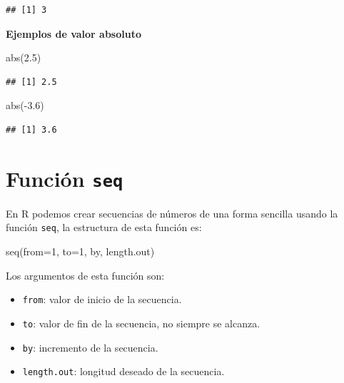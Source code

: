 \documentclass[
]{book}
\makeatletter
\newenvironment{Shaded}{\begin{snugshade}}{\end{snugshade}}
\newcommand{\AttributeTok}[1]{\textcolor[rgb]{0.77,0.63,0.00}{#1}}
\newcommand{\DecValTok}[1]{\textcolor[rgb]{0.00,0.00,0.81}{#1}}
\newcommand{\FloatTok}[1]{\textcolor[rgb]{0.00,0.00,0.81}{#1}}
\newcommand{\FunctionTok}[1]{\textcolor[rgb]{0.00,0.00,0.00}{#1}}
\newcommand{\NormalTok}[1]{#1}
\newcommand{\SpecialCharTok}[1]{\textcolor[rgb]{0.00,0.00,0.00}{#1}}
\providecommand{\tightlist}{%
  \setlength{\itemsep}{0pt}\setlength{\parskip}{0pt}}
\newenvironment{kframe}{%
\medskip{}
\setlength{\fboxsep}{.8em}
 \def\at@end@of@kframe{}%
 \ifinner\ifhmode%
  \def\at@end@of@kframe{\end{minipage}}%
  \begin{minipage}{\columnwidth}%
 \fi\fi%
 \def\FrameCommand##1{\hskip\@totalleftmargin \hskip-\fboxsep
 \colorbox{shadecolor}{##1}\hskip-\fboxsep
     \hskip-\linewidth \hskip-\@totalleftmargin \hskip\columnwidth}%
 \MakeFramed {\advance\hsize-\width
   \@totalleftmargin\z@ \linewidth\hsize
   \@setminipage}}%
 {\par\unskip\endMakeFramed%
 \at@end@of@kframe}
\renewenvironment{Shaded}{\begin{kframe}}{\end{kframe}}
\makeatother
\begin{document}
\begin{verbatim}
## [1] 3
\end{verbatim}

\textbf{Ejemplos de valor absoluto}

\begin{Shaded}
\begin{Highlighting}[]
\FunctionTok{abs}\NormalTok{(}\FloatTok{2.5}\NormalTok{)}
\end{Highlighting}
\end{Shaded}

\begin{verbatim}
## [1] 2.5
\end{verbatim}

\begin{Shaded}
\begin{Highlighting}[]
\FunctionTok{abs}\NormalTok{(}\SpecialCharTok{{-}}\FloatTok{3.6}\NormalTok{)}
\end{Highlighting}
\end{Shaded}

\begin{verbatim}
## [1] 3.6
\end{verbatim}

\hypertarget{funciuxf3n-seq}{%
\section{\texorpdfstring{Función \texttt{seq}}{Función seq}}\label{funciuxf3n-seq}}

En R podemos crear secuencias de números de una forma sencilla usando la función \texttt{seq}, la estructura de esta función es:

\begin{Shaded}
\begin{Highlighting}[]
\FunctionTok{seq}\NormalTok{(}\AttributeTok{from=}\DecValTok{1}\NormalTok{, }\AttributeTok{to=}\DecValTok{1}\NormalTok{, by, length.out)}
\end{Highlighting}
\end{Shaded}

Los argumentos de esta función son:

\begin{itemize}
\tightlist
\item
  \texttt{from}: valor de inicio de la secuencia.
\item
  \texttt{to}: valor de fin de la secuencia, no siempre se alcanza.
\item
  \texttt{by}: incremento de la secuencia.
\item
  \texttt{length.out}: longitud deseado de la secuencia.
\end{itemize}
\end{document}
